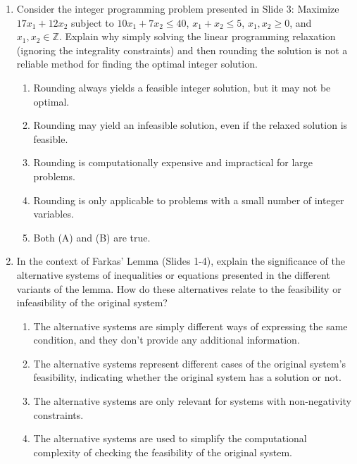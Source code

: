 \documentclass{article}%
\begin{document}
\begin{enumerate}
\begin{enumerate}
\item Gomory cuts are used to convert an integer programming problem into a linear programming problem.%
\item Gomory cuts are only applicable to binary integer programming problems.%
\end{enumerate}%
\vspace{1em}%
\item Consider the integer programming problem presented in Slide 3: Maximize $17x_1 + 12x_2$ subject to $10x_1 + 7x_2 \le 40$, $x_1 + x_2 \le 5$, $x_1, x_2 \ge 0$, and $x_1, x_2 \in \mathbb{Z}$.  Explain why simply solving the linear programming relaxation (ignoring the integrality constraints) and then rounding the solution is not a reliable method for finding the optimal integer solution.%
\begin{enumerate}%
\item Rounding always yields a feasible integer solution, but it may not be optimal.%
\item Rounding may yield an infeasible solution, even if the relaxed solution is feasible.%
\item Rounding is computationally expensive and impractical for large problems.%
\item Rounding is only applicable to problems with a small number of integer variables.%
\item Both (A) and (B) are true.%
\end{enumerate}%
\vspace{1em}%
\item In the context of Farkas' Lemma (Slides 1-4), explain the significance of the alternative systems of inequalities or equations presented in the different variants of the lemma. How do these alternatives relate to the feasibility or infeasibility of the original system?%
\begin{enumerate}%
\item The alternative systems are simply different ways of expressing the same condition, and they don't provide any additional information.%
\item The alternative systems represent different cases of the original system's feasibility, indicating whether the original system has a solution or not.%
\item The alternative systems are only relevant for systems with non-negativity constraints.%
\item The alternative systems are used to simplify the computational complexity of checking the feasibility of the original system.%

\end{enumerate}
\end{enumerate}
\end{document}
